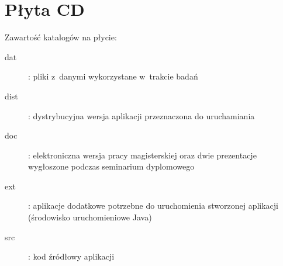 \chapter{Płyta CD}\label{app:plyta}

\begin{figure}[htb]
\makebox[\textwidth]{\framebox[12.8cm]{\rule{0pt}{12.8cm}}}
\end{figure}
\pagebreak

Zawartość katalogów na płycie:
\begin{description}
\item[dat] : pliki z~danymi wykorzystane w~trakcie badań
\item[dist] : dystrybucyjna wersja aplikacji przeznaczona do uruchamiania
\item[doc] : elektroniczna wersja pracy magisterskiej oraz dwie prezentacje wygłoszone podczas seminarium dyplomowego
\item[ext] : aplikacje dodatkowe potrzebne do uruchomienia stworzonej aplikacji (środowisko uruchomieniowe Java)
\item[src] : kod źródłowy aplikacji
\end{description}
